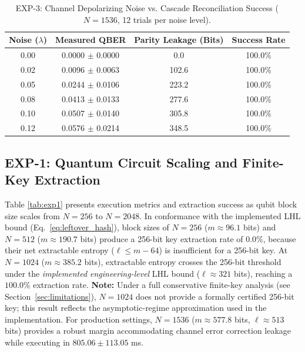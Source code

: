 \documentclass[journal,10pt,twocolumn]{article}
\begin{document}
\begin{table}[t]
\caption{EXP-3: Channel Depolarizing Noise vs. Cascade Reconciliation Success ($N=1536$, 12 trials per noise level).}
\centering
\small
\begin{tabular}{cccc}
\toprule
\textbf{Noise ($\lambda$)} & \textbf{Measured QBER} & \textbf{Parity Leakage (Bits)} & \textbf{Success Rate} \\
\midrule
0.00 & 0.0000 $\pm$ 0.0000 & 0.0 & 100.0\% \\
0.02 & 0.0096 $\pm$ 0.0063 & 102.6 & 100.0\% \\
0.05 & 0.0244 $\pm$ 0.0106 & 223.2 & 100.0\% \\
0.08 & 0.0413 $\pm$ 0.0133 & 277.6 & 100.0\% \\
0.10 & 0.0507 $\pm$ 0.0140 & 305.8 & 100.0\% \\
0.12 & 0.0576 $\pm$ 0.0214 & 348.5 & 100.0\% \\
\bottomrule
\end{tabular}
\label{tab:exp3}
\end{table}

\subsection{EXP-1: Quantum Circuit Scaling and Finite-Key Extraction}
Table \ref{tab:exp1} presents execution metrics and extraction success as qubit block size scales from $N=256$ to $N=2048$. In conformance with the implemented LHL bound (Eq.~\ref{eq:leftover_hash}), block sizes of $N=256$ ($m \approx 96.1$ bits) and $N=512$ ($m \approx 190.7$ bits) produce a 256-bit key extraction rate of $0.0\%$, because their net extractable entropy ($\ell \le m - 64$) is insufficient for a 256-bit key. At $N=1024$ ($m \approx 385.2$ bits), extractable entropy crosses the 256-bit threshold under the \emph{implemented engineering-level} LHL bound ($\ell \approx 321$ bits), reaching a $100.0\%$ extraction rate. \textbf{Note:} Under a full conservative finite-key analysis (see Section~\ref{sec:limitations}), $N=1024$ does not provide a formally certified 256-bit key; this result reflects the asymptotic-regime approximation used in the implementation. For production settings, $N=1536$ ($m \approx 577.8$ bits, $\ell \approx 513$ bits) provides a robust margin accommodating channel error correction leakage while executing in $805.06 \pm 113.05$ ms.
\end{document}

